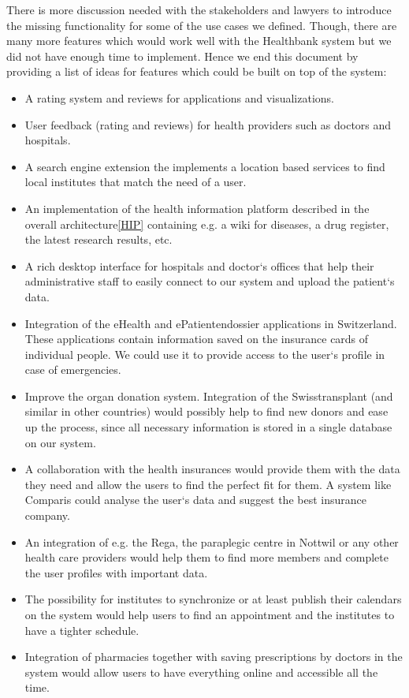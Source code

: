 \newline
There is more discussion needed with the stakeholders and lawyers to introduce the missing functionality for some of the use cases we defined. Though, there are many more features which would work well with the Healthbank system but we did not have enough time to implement. Hence we end this document by providing a list of ideas for features which could be built on top of the system:
\begin{itemize}
	\item A rating system and reviews for applications and visualizations.
	\item User feedback (rating and reviews) for health providers such as doctors and hospitals.
	\item A search engine extension the implements a location based services to find local institutes that match the need of a user. 
	\item An implementation of the health information platform described in the overall architecture\ref{HIP} containing e.g. a wiki for diseases, a drug register, the latest research results, etc. 
	\item A rich desktop interface for hospitals and doctor`s offices that help their administrative staff to easily connect to our system and upload the patient`s data.
	\item Integration of the eHealth and ePatientendossier applications in Switzerland. These applications contain information saved on the insurance cards of individual people. We could use it to provide access to the user`s profile in case of emergencies.
	\item Improve the organ donation system. Integration of the Swisstransplant (and similar in other countries) would possibly help to find new donors and ease up the process, since all necessary information is stored in a single database on our system.
	\item A collaboration with the health insurances would provide them with the data they need and allow the users to find the perfect fit for them. A system like Comparis could analyse the user`s data and suggest the best insurance company.
	\item An integration of e.g. the Rega, the paraplegic centre in Nottwil or any other health care providers would help them to find more members and complete the user profiles with important data. 
	\item The possibility for institutes to synchronize or at least publish their calendars on the system would help users to find an appointment and the institutes to have a tighter schedule.
	\item Integration of pharmacies together with saving prescriptions by doctors in the system would allow users to have everything online and accessible all the time. 
\end{itemize}

